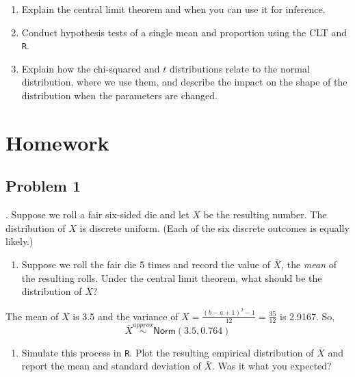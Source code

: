 \documentclass[
]{book}
\providecommand{\tightlist}{%
  \setlength{\itemsep}{0pt}\setlength{\parskip}{0pt}}
\begin{document}
\begin{enumerate}
\def\labelenumi{\arabic{enumi})}
\tightlist
\item
  Explain the central limit theorem and when you can use it for inference.\\
\item
  Conduct hypothesis tests of a single mean and proportion using the CLT and \texttt{R}.\\
\item
  Explain how the chi-squared and \(t\) distributions relate to the normal distribution, where we use them, and describe the impact on the shape of the distribution when the parameters are changed.
\end{enumerate}

\hypertarget{homework-20}{%
\section{Homework}\label{homework-20}}

\hypertarget{problem-1-20}{%
\subsection{Problem 1}\label{problem-1-20}}

. Suppose we roll a fair six-sided die and let \(X\) be the resulting number. The distribution of \(X\) is discrete uniform. (Each of the six discrete outcomes is equally likely.)

\begin{enumerate}
\def\labelenumi{\alph{enumi}.}
\tightlist
\item
  Suppose we roll the fair die 5 times and record the value of \(\bar{X}\), the \emph{mean} of the resulting rolls. Under the central limit theorem, what should be the distribution of \(\bar{X}\)?
\end{enumerate}

The mean of \(X\) is 3.5 and the variance of \(X = \frac{(b-a+1)^2-1}{12} = \frac{35}{12}\) is 2.9167. So,
\[
\bar{X}\overset{approx}{\sim}\textsf{Norm}(3.5,0.764)
\]

\begin{enumerate}
\def\labelenumi{\alph{enumi}.}
\setcounter{enumi}{1}
\tightlist
\item
  Simulate this process in \texttt{R}. Plot the resulting empirical distribution of \(\bar{X}\) and report the mean and standard deviation of \(\bar{X}\). Was it what you expected?
\end{enumerate}
\end{document}
